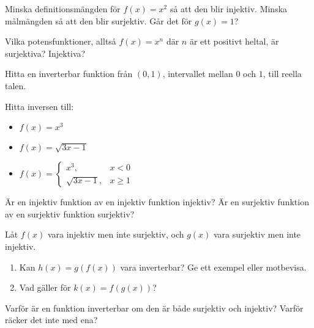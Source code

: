 \begin{problem}
	Minska definitionsmängden för \(f(x)=x^2\) så att den blir injektiv. Minska målmängden så att den blir surjektiv. Går det för \(g(x) = 1\)?
\end{problem}

\begin{problem}
	Vilka potensfunktioner, alltså \(f(x) = x^n\) där \(n\) är ett positivt heltal, är surjektiva? Injektiva?
\end{problem}

\begin{problem}
	Hitta en inverterbar funktion från \((0, 1)\), intervallet mellan \(0\) och \(1\), till reella talen.
\end{problem}

\begin{problem}
	Hitta inversen till:
	\begin{itemize}
		\item \(f(x) = x^3\) 
		\item \(f(x) = \sqrt{3x - 1}\) 
		\item \(f(x) = \begin{cases} x^3, & x < 0 \\ \sqrt{3x-1}, &x \geq 1  \end{cases} \)  %
	\end{itemize}
\end{problem}

\begin{problem}
	Är en injektiv funktion av en injektiv funktion injektiv? Är en surjektiv funktion av en surjektiv funktion surjektiv?
\end{problem}

\begin{problem}
	Låt \(f(x)\) vara injektiv men inte surjektiv, och \(g(x)\) vara surjektiv men inte injektiv. 
	\begin{enumerate}[label={\alph*)}]
		\item Kan \(h(x) = g(f(x))\) vara inverterbar? Ge ett exempel eller motbevisa.
		\item Vad gäller för \(k(x) = f(g(x))\)?
	\end{enumerate}
\end{problem}

\begin{problem}
	Varför är en funktion inverterbar om den är både surjektiv och injektiv? Varför räcker det inte med ena?
\end{problem}

